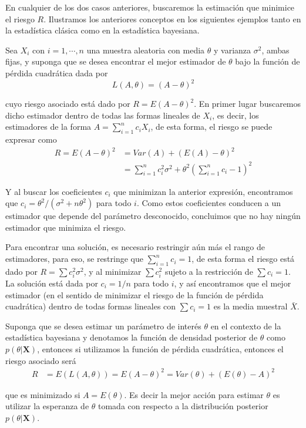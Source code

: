 \documentclass[10pt,openright]{book}\usepackage[]{graphicx}\usepackage[]{color}
\begin{document}
En cualquier de los dos casos anteriores, buscaremos la estimación que minimice el riesgo $R$. Ilustramos los anteriores conceptos en los siguientes ejemplos tanto en la estadística clásica como en la estadística bayesiana.

\begin{Eje}
Sea $X_i$ con $i=1,\cdots, n$ una muestra aleatoria con media $\theta$ y varianza $\sigma^2$, ambas fijas, y suponga que se desea encontrar el mejor estimador de $\theta$ bajo la función de pérdida cuadrática dada por
\begin{equation*}
L(A,\theta)=(A-\theta)^2
\end{equation*}

cuyo riesgo asociado está dado por $R=E(A-\theta)^2$. En primer lugar buscaremos dicho estimador dentro de todas las formas lineales de $X_i$, es decir, los estimadores de la forma $A=\sum_{i=1}^nc_iX_i$, de esta forma, el riesgo se puede expresar como
\begin{align*}
R=E(A-\theta)^2&=Var(A)+(E(A)-\theta)^2\\
&=\sum_{i=1}^nc_i^2\sigma^2+\theta^2(\sum_{i=1}^nc_i-1)^2
\end{align*}

Y al buscar los coeficientes $c_i$ que minimizan la anterior expresión, encontramos que $c_i=\theta^2/(\sigma^2+n\theta^2)$ para todo $i$. Como estos coeficientes conducen a un estimador que depende del parámetro desconocido, concluimos que no hay ningún estimador que minimiza el riesgo.

Para encontrar una solución, es necesario restringir aún más el rango de estimadores, para eso, se restringe que $\sum_{i=1}^nc_i=1$, de esta forma el riesgo está dado por $R=\sum c_i^2\sigma^2$, y al minimizar $\sum c_i^2$ sujeto a la restricción de $\sum c_i=1$. La solución está dada por $c_i=1/n$ para todo $i$, y así encontramos que el mejor estimador (en el sentido de minimizar el riesgo de la función de pérdida cuadrática) dentro de todas formas lineales con $\sum c_i=1$ es la media muestral $\bar{X}$.
\end{Eje}

\begin{Eje}
Suponga que se desea estimar un parámetro de interés $\theta$ en el contexto de la estadística bayesiana y denotamos la función de densidad posterior de $\theta$ como $p(\theta|\mathbf{X})$, entonces si utilizamos la función de pérdida cuadrática, entonces el riesgo asociado será
\begin{align*}
R&=E(L(A,\theta))=E (A-\theta)^2=Var(\theta)+(E(\theta)-A)^2
\end{align*}

que es minimizado si $A=E(\theta)$. Es decir la mejor acción para estimar $\theta$ es utilizar la esperanza de $\theta$ tomada con respecto a la distribución posterior $p(\theta|\mathbf{X})$.
\end{Eje}
\end{document}
